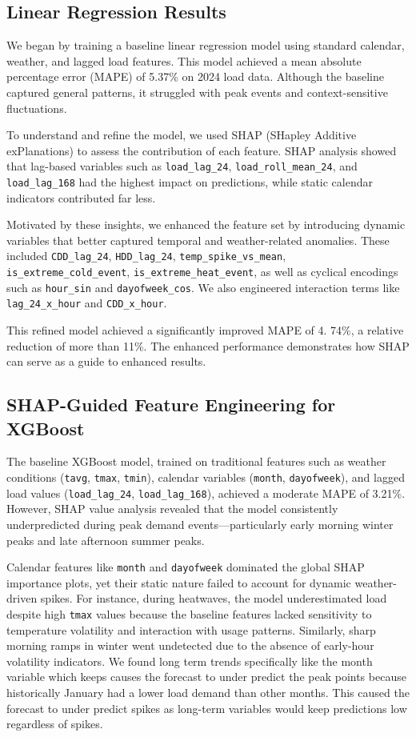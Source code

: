 \documentclass[final,numbered]{ifacconf}
\begin{document}
\subsection{Linear Regression Results}
We began by training a baseline linear regression model using standard calendar, weather, and lagged load features. This model achieved a mean absolute percentage error (MAPE) of 5.37\% on 2024 load data. Although the baseline captured general patterns, it struggled with peak events and context-sensitive fluctuations.

To understand and refine the model, we used SHAP (SHapley Additive exPlanations) to assess the contribution of each feature. SHAP analysis showed that lag-based variables such as \texttt{load_lag_24}, \texttt{load_roll_mean_24}, and \texttt{load_lag_168} had the highest impact on predictions, while static calendar indicators contributed far less.

Motivated by these insights, we enhanced the feature set by introducing dynamic variables that better captured temporal and weather-related anomalies. These included \texttt{CDD_lag_24}, \texttt{HDD_lag_24}, \texttt{temp_spike_vs_mean}, \texttt{is_extreme_cold_event}, \texttt{is_extreme_heat_event}, as well as cyclical encodings such as \texttt{hour_sin} and \texttt{dayofweek_cos}. We also engineered interaction terms like \texttt{lag_24_x_hour} and \texttt{CDD_x_hour}.

This refined model achieved a significantly improved MAPE of 4. 74\%, a relative reduction of more than 11\%. The enhanced performance demonstrates how SHAP can serve as a guide to enhanced results.

\subsection{SHAP-Guided Feature Engineering for XGBoost}

The baseline XGBoost model, trained on traditional features such as weather conditions (\texttt{tavg}, \texttt{tmax}, \texttt{tmin}), calendar variables (\texttt{month}, \texttt{dayofweek}), and lagged load values (\texttt{load\_lag\_24}, \texttt{load\_lag\_168}), achieved a moderate MAPE of 3.21\%. However, SHAP value analysis revealed that the model consistently underpredicted during peak demand events—particularly early morning winter peaks and late afternoon summer peaks.

Calendar features like \texttt{month} and \texttt{dayofweek} dominated the global SHAP importance plots, yet their static nature failed to account for dynamic weather-driven spikes. For instance, during heatwaves, the model underestimated load despite high \texttt{tmax} values because the baseline features lacked sensitivity to temperature volatility and interaction with usage patterns. Similarly, sharp morning ramps in winter went undetected due to the absence of early-hour volatility indicators. We found long term trends specifically like the month variable which keeps causes the forecast to under predict the peak points because historically January had a lower load demand than other months. This caused the forecast to under predict spikes as long-term variables would keep predictions low regardless of spikes.
\end{document}
